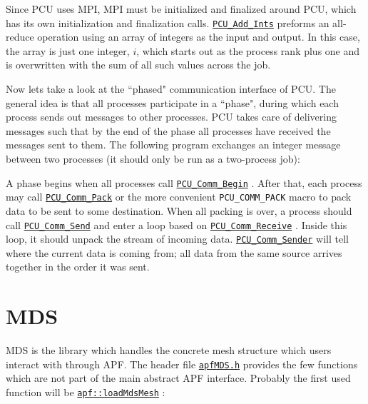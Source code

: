 \documentclass{article}
\begin{document}
Since PCU uses MPI, MPI must be initialized and finalized around
PCU, which has its own initialization and finalization calls.
\href{http://scorec.rpi.edu/~dibanez/core/pcu_8c.html#abf86ddf22cc114fd2bd3f054a067c225}{\texttt{PCU\_Add\_Ints}}
preforms an all-reduce operation using
an array of integers as the input and output.
In this case, the array is just one integer, $i$, which starts
out as the process rank plus one and is overwritten with the sum
of all such values across the job.

Now lets take a look at the ``phased" communication interface of PCU.
The general idea is that all processes participate in a ``phase",
during which each process sends out messages to other processes.
PCU takes care of delivering messages such that by the end of
the phase all processes have received the messages sent to them.
The following program exchanges an integer message between two
processes (it should only be run as a two-process job):



A phase begins when all processes call
\href{http://scorec.rpi.edu/~dibanez/core/pcu_8c.html#aa1821bf79d880c38cdd91515751799ac}{\texttt{PCU\_Comm\_Begin}}
.
After that, each process may call
\href{http://scorec.rpi.edu/~dibanez/core/pcu_8c.html#afd8a6600d960129089c45fd49c1b2311}{\texttt{PCU\_Comm\_Pack}}
or the more convenient
\texttt{PCU\_COMM\_PACK}
macro to pack data to be sent to some destination.
When all packing is over, a process should call
\href{http://scorec.rpi.edu/~dibanez/core/pcu_8c.html#a263061f00174fc7a004dcb198778006c}{\texttt{PCU\_Comm\_Send}}
and enter a loop based on
\href{http://scorec.rpi.edu/~dibanez/core/pcu_8c.html#ad02bc960bcfa8e2d6b09458dca38bf53}{\texttt{PCU\_Comm\_Receive}}
.
Inside this loop, it should unpack the stream of incoming data.
\href{http://scorec.rpi.edu/~dibanez/core/pcu_8c.html#ac4577ded2ec61de4b4141e3353aac440}{\texttt{PCU\_Comm\_Sender}}
will tell where the current data is coming
from; all data from the same source arrives together in the
order it was sent.

\section{MDS}

MDS is the library which handles the concrete mesh structure which
users interact with through APF.
The header file
\href{https://github.com/SCOREC/core/blob/master/mds/apfMDS.h}{\texttt{apfMDS.h}}
provides the few functions
which are not part of the main abstract APF interface.
Probably the first used function will be
\href{http://scorec.rpi.edu/~dibanez/core/namespaceapf.html#a7be5af15392b7c92c660b0958bb75969}{\texttt{apf::loadMdsMesh}}
:
\end{document}
